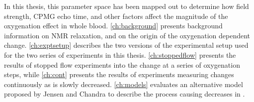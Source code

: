 In this thesis, this parameter space has been mapped out to determine how field strength, CPMG echo time, and other factors affect the magnitude of the oxygenation
\Ttwo effect in whole blood.
\autoref{ch:background} presents background information on NMR relaxation, and on the origin of the oxygenation dependent \Ttwo change.
\autoref{ch:exptsetup} describes the two versions of the experimental setup used for the two series of experiments in this thesis.
\autoref{ch:stoppedflow} presents the results of stopped flow experiments into the \Ttwo change at a series of oxygenation steps, while \autoref{ch:cont} presents the results of experiments measuring \Ttwo changes continuously as \SOtwo is slowly decreased.
\autoref{ch:models} evaluates an alternative model proposed by Jensen and Chandra to describe the process causing decreases in \Ttwo\cite{JensenNMRrelaxationtissues2000}.
